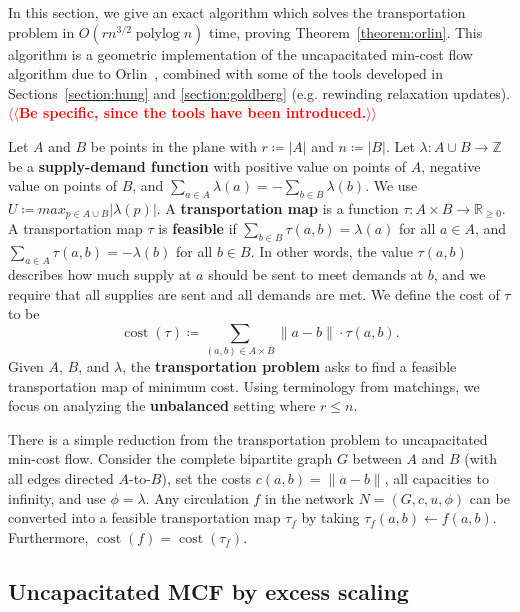 \documentclass[11pt]{article}
\makeatletter
\def\polylog{\mathop{\mathrm{polylog}}}
\def\reals{\mathbb{R}}
\def\ints{\mathbb{Z}}
\def\abs#1{\mathopen| #1 \mathclose|}		%
\def\norm#1{\mathopen\| #1 \mathclose\|}	%
\def\tsupply{\lambda}
\def\fsupply{\phi}
\def\cost{\operatorname{cost}}
\theoremstyle{plain}
\numberwithin{figure}{section}
\def\EMPH#1{\textbf{\boldmath #1}}
\def\n@te#1{\textsf{\boldmath \textbf{$\langle\!\langle$#1$\rangle\!\rangle$}}\leavevmode}
\def\note#1{\textcolor{red}{\n@te{#1}}}
\makeatother
\begin{document}

In this section, we give an exact algorithm which solves the transportation
problem in $O(rn^{3/2}\polylog n)$ time, proving Theorem~\ref{theorem:orlin}.
This algorithm is a geometric implementation of the uncapacitated min-cost flow
algorithm due to Orlin~\cite{O93}, combined with some of the tools developed
in Sections~\ref{section:hung} and \ref{section:goldberg} (e.g. rewinding relaxation
updates). \note{Be specific, since the tools have been introduced.}

Let $A$ and $B$ be points in the plane with $r \coloneqq \abs{A}$ and
$n \coloneqq \abs{B}$.
Let $\tsupply:A \cup B \to \ints$ be a \EMPH{supply-demand function} with
positive value on points of $A$, negative value on points of $B$, and
$\sum_{a \in A} \tsupply(a) = - \sum_{b \in B} \tsupply(b)$.
We use $U \coloneqq max_{p \in A \cup B} \abs{\tsupply(p)}$.
A \EMPH{transportation map} is a function
$\tau: A \times B \to \reals_{\geq 0}$.
A transportation map $\tau$ is \EMPH{feasible} if
$\sum_{b \in B} \tau(a, b) = \tsupply(a)$ for all $a \in A$, and
$\sum_{a \in A} \tau(a, b) = -\tsupply(b)$ for all $b \in B$.
In other words, the value $\tau(a, b)$ describes how much supply at $a$ should
be sent to meet demands at $b$, and we require that all supplies are sent
and all demands are met.
We define the cost of $\tau$ to be
\[
	\cost(\tau) \coloneqq \sum_{(a, b) \in A \times B} \norm{a-b} \cdot \tau(a, b).
\]
Given $A$, $B$, and $\tsupply$, the \EMPH{transportation problem} asks to find
a feasible transportation map of minimum cost.
Using terminology from matchings, we focus on analyzing the \EMPH{unbalanced}
setting where $r \leq n$.

There is a simple reduction from the transportation problem to uncapacitated
min-cost flow.
Consider the complete bipartite graph $G$ between $A$ and $B$ (with all edges
directed $A$-to-$B$), set the costs $c(a, b) = \norm{a-b}$, all capacities to
infinity, and use $\fsupply = \tsupply$.
Any circulation $f$ in the network $N = (G, c, u, \fsupply)$ can be converted
into a feasible transportation map $\tau_f$ by taking
$\tau_f(a, b) \gets f(a, b)$.
Furthermore, $\cost(f) = \cost(\tau_f)$.

\subsection{Uncapacitated MCF by excess scaling}
\end{document}
